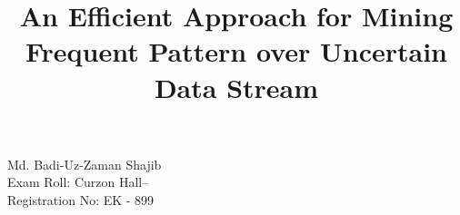 \documentclass[12pt,a4paper,oneside]{csedu}  %
\begin{document}
\frontmatter      %

\title{An Efficient Approach for Mining Frequent Pattern over Uncertain Data Stream}
\authors  %
{Md. Badi-Uz-Zaman Shajib  \\Exam Roll: Curzon Hall--\\Registration No: EK - 899}



\maketitle



\fancyhead{}  %
\rhead{\thepage}  %
\lhead{}  %

\pagestyle{fancy}  %
\end{document}
